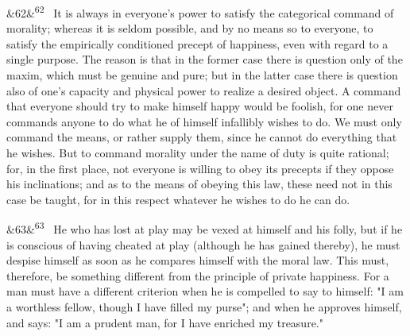 \documentclass[12pt]{article}
\newcommand{\para}[1][]{\par\noindent\ifx&#1&\else\textsuperscript{\footnotesize #1}~\fi}
\begin{document}
\para[62] It is always in everyone's power to satisfy the categorical command of morality; whereas it is seldom possible, and by no means so to everyone, to satisfy the empirically conditioned precept of happiness, even with regard to a single purpose. The reason is that in the former case there is question only of the maxim, which must be genuine and pure; but in the latter case there is question also of one's capacity and physical power to realize a desired object. A command that everyone should try to make himself happy would be foolish, for one never commands anyone to do what he of himself infallibly wishes to do. We must only command the means, or rather supply them, since he cannot do everything that he wishes. But to command morality under the name of duty is quite rational; for, in the first place, not everyone is willing to obey its precepts if they oppose his inclinations; and as to the means of obeying this law, these need not in this case be taught, for in this respect whatever he wishes to do he can do.

\para[63] He who has lost at play may be vexed at himself and his folly, but if he is conscious of having cheated at play (although he has gained thereby), he must despise himself as soon as he compares himself with the moral law. This must, therefore, be something different from the principle of private happiness. For a man must have a different criterion when he is compelled to say to himself: "I am a worthless fellow, though I have filled my purse"; and when he approves himself, and says: "I am a prudent man, for I have enriched my treasure."
\end{document}
